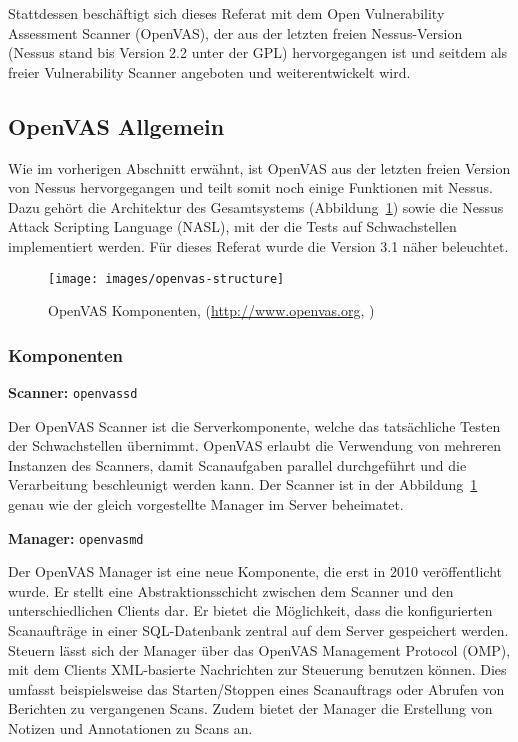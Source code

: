 Stattdessen beschäftigt sich dieses Referat mit dem Open Vulnerability Assessment Scanner 
(OpenVAS), der aus der letzten freien Nessus-Version (Nessus stand bis Version 2.2 unter 
der GPL) hervorgegangen ist und seitdem als freier Vulnerability Scanner angeboten 
und weiterentwickelt wird.

\subsection{OpenVAS Allgemein}

Wie im vorherigen Abschnitt erwähnt, ist OpenVAS aus der letzten freien Version von 
Nessus hervorgegangen und teilt somit noch einige Funktionen mit Nessus. Dazu gehört 
\uA die Architektur des Gesamtsystems (Abbildung~\ref{fig:openvas-structure}) sowie die 
Nessus Attack Scripting Language (NASL), mit der die Tests auf Schwachstellen implementiert 
werden. Für dieses Referat wurde die Version 3.1 näher beleuchtet.


\begin{figure}
\begin{center}
\texttt{[image: images/openvas-structure]}
\caption{OpenVAS Komponenten, (\url{http://www.openvas.org}, \protect{})}
\label{fig:openvas-structure}
\end{center}
\end{figure}

\subsubsection{Komponenten}

\textbf{Scanner:} \texttt{openvassd}

Der OpenVAS Scanner ist die Serverkomponente, welche das tatsächliche Testen der 
Schwachstellen übernimmt. OpenVAS erlaubt die Verwendung von mehreren Instanzen des 
Scanners, damit Scanaufgaben parallel durchgeführt und die Verarbeitung beschleunigt 
werden kann. Der Scanner ist in der Abbildung~\ref{fig:openvas-structure} genau wie 
der gleich vorgestellte Manager im Server beheimatet.  

\textbf{Manager:} \texttt{openvasmd}
\label{openvas:openvas-manager}

Der OpenVAS Manager ist eine neue Komponente, die erst in 2010 veröffentlicht wurde. 
Er stellt eine Abstraktionsschicht zwischen dem Scanner und den unterschiedlichen Clients 
dar. Er bietet die Möglichkeit, dass die konfigurierten Scanaufträge in einer SQL-Datenbank 
zentral auf dem Server gespeichert werden. Steuern lässt sich der Manager über das OpenVAS 
Management Protocol (OMP), mit dem Clients XML-basierte Nachrichten zur Steuerung benutzen 
können. Dies umfasst beispielsweise das Starten/Stoppen eines Scanauftrags oder Abrufen von 
Berichten zu vergangenen Scans. Zudem bietet der Manager die Erstellung von Notizen und 
Annotationen zu Scans an. \cite{openvas-openvasmd} \cite{openvas-omp}


